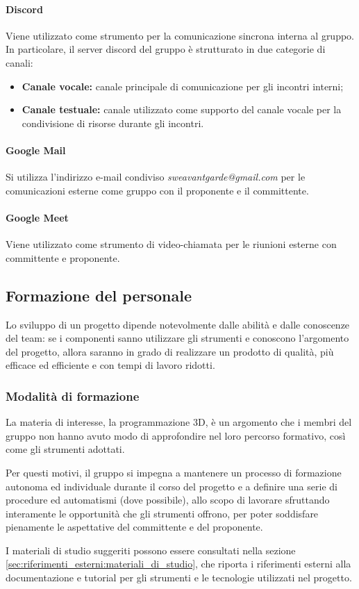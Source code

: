 \paragraph{Discord}
Viene utilizzato come strumento per la comunicazione sincrona interna al gruppo. In particolare, il server discord del gruppo è strutturato in due categorie di canali:
\begin{itemize}
    \item \textbf{Canale vocale:} canale principale di comunicazione per gli incontri interni;
    \item \textbf{Canale testuale:} canale utilizzato come supporto del canale vocale per la condivisione di risorse durante gli incontri.
\end{itemize}

\paragraph{Google Mail}
Si utilizza l’indirizzo e-mail condiviso \textit{sweavantgarde@gmail.com} per le comunicazioni esterne come gruppo con il proponente e il committente.

\paragraph{Google Meet}
Viene utilizzato come strumento di video-chiamata per le riunioni esterne con committente e proponente.

\subsection{Formazione del personale}\label{sec:processi_organizzativi:formazione_personale}
Lo sviluppo di un progetto dipende notevolmente dalle abilità e dalle conoscenze del team: se i componenti sanno utilizzare gli strumenti e conoscono l'argomento del progetto, allora saranno in grado di realizzare un prodotto di qualità, più efficace ed efficiente e con tempi di lavoro ridotti.
\subsubsection{Modalità di formazione}
La materia di interesse, la programmazione 3D, è un argomento che i membri del gruppo non hanno avuto modo di approfondire nel loro percorso formativo, così come gli strumenti adottati.
\par Per questi motivi, il gruppo si impegna a mantenere un processo di formazione autonoma ed individuale durante il corso del progetto e a definire una serie di procedure ed automatismi (dove possibile), allo scopo di lavorare sfruttando interamente le opportunità che gli strumenti offrono, per poter soddisfare pienamente le aspettative del committente e del proponente.
\par I materiali di studio suggeriti possono essere consultati nella sezione \ref{sec:riferimenti_esterni:materiali_di_studio}, che riporta i riferimenti esterni alla documentazione e tutorial per gli strumenti e le tecnologie utilizzati nel progetto.

